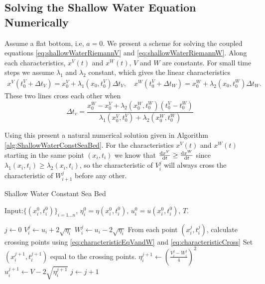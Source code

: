 \documentclass[12pt]{article}
\begin{document}
\subsection{Solving the Shallow Water Equation Numerically}
Assume a flat bottom, i.e, $a = 0$. We present a scheme for solving the coupled equations \eqref{eq:shallowWaterRiemannV} and \eqref{eq:shallowWaterRiemannW}. Along each characteristics, $x^V(t)$ and $x^W(t)$, $V$ and $W$ are constants. For small time steps we assume $\lambda_1$ and $\lambda_2$ constant, which gives the linear characteristics
\begin{align}
	\label{eq:characteristicEqVandW}
	x^V(t^V_0+\Delta t_V) = x^V_0 + \lambda_1(x_0,t^V_0)\Delta t_V ,\quad x^W(t^V_0+\Delta t_W) = x^W_0 + \lambda_2(x_0,t_0^W)\Delta t_W.
\end{align}
These two lines cross each other when 
\begin{equation}
\label{eq:characteristicCross}
\Delta t_v = \frac{x_0^W - x_0^V + \lambda_2(x_0^W,t_0^W)(t_0^V - t_0^W)}{\lambda_1(x_0^V,t_0^V)+\lambda_2(x_0^W,t_0^W)}
\end{equation}

Using this present a natural numerical solution given in  Algorithm \ref{alg:ShallowWaterConstSeaBed}.  
For the characteristics $x^V(t)$ and $x^W(t)$ starting in the same point $(x_i,t_i)$ we know that $\frac{\operatorname{d}\! x^V}{\operatorname{d}\! t}\geq \frac{\operatorname{d}\! x^W}{\operatorname{d}\! t}$ since $\lambda_1(x_i,t_i)\geq \lambda_2(x_i,t_i)$, so the characteristic of $V_i^j$ will always cross the characteristic of $W_{i+1}^j$ before any other. 
\begin{algorithm}
	\caption{Shallow Water Constant Sea Bed}
	\begin{algorithmic}[1]
		\State    Input:$\{(x^0_i,t^0_i)\}_{i=1\ldots n}$, $\eta^0_i=\eta(x^0_i,t^0_i)$, $u^0_i = u(x_i^0,t^0_i)$,  $T$.

		\State $j\leftarrow 0$
		\State $V^j_i \leftarrow u_i + 2\sqrt{\eta_i}$
		\State $W^j_i \leftarrow u_i - 2\sqrt{\eta_i}$
		\State From each point $(x^j_i,t^j_i)$, calculate crossing points using 		
		\eqref{eq:characteristicEqVandW} and \eqref{eq:characteristicCross}
		\State Set $(x^{j+1}_i,t^{j+1}_i)$ equal to the crossing points.
		\State $\eta_i^{j+1} \leftarrow \left(\frac{V_i^j -W_i^j}{4}\right)^2$
		\State $u_i^{j+1} \leftarrow V - 2\sqrt{\eta_i^{j+1}}$
		\State $j\leftarrow j + 1$
		\EndWhile
	\end{algorithmic}
	\label{alg:ShallowWaterConstSeaBed}
\end{algorithm}
\end{document}
